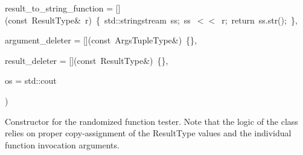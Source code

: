 {\begin{DoxyParamCaption}
\item[{Result\+To\+String\+Function\+Type}]{result\+\_\+to\+\_\+string\+\_\+function = {\ttfamily \mbox{[}\mbox{]}(const~ResultType\&~r)~\{~std\+:\+:stringstream~ss;~ss~$<$$<$~r;~return~ss.str();~\}}, }
\item[{Args\+Deleter\+Function\+Type}]{argument\+\_\+deleter = {\ttfamily \mbox{[}\mbox{]}(const~ArgsTupleType\&)~\{\}}, }
\item[{Result\+Deleter\+Function\+Type}]{result\+\_\+deleter = {\ttfamily \mbox{[}\mbox{]}(const~ResultType\&)~\{\}}, }
\item[{std\+::ostream \&}]{os = {\ttfamily std\+:\+:cout}}
\end{DoxyParamCaption}
)\hspace{0.3cm}{\ttfamily [inline]}}\hypertarget{classunittest_1_1_randomized_function_test_a4f908f1ed468b9d25fd622d6d1b1794c}{}\label{classunittest_1_1_randomized_function_test_a4f908f1ed468b9d25fd622d6d1b1794c}
Constructor for the randomized function tester. Note that the logic of the class relies on proper copy-\/assignment of the Result\+Type values and the individual function invocation arguments. 
